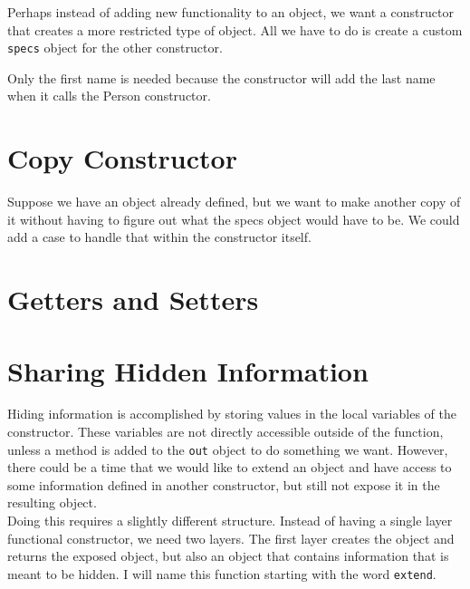 
Perhaps instead of adding new functionality to an object, we want a constructor that creates a more restricted type of object. All we have to do is create a custom \texttt{specs} object for the other constructor.


Only the first name is needed because the constructor will add the last name when it calls the Person constructor.


\section{Copy Constructor}

Suppose we have an object already defined, but we want to make another copy of it without having to figure out what the specs object would have to be. We could add a case to handle that within the constructor itself.

\section{Getters and Setters}

\section{}

\section{Sharing Hidden Information}

Hiding information is accomplished by storing values in the local variables of the constructor. These variables are not directly accessible outside of the function, unless a method is added to the \texttt{out} object to do something we want. However, there could be a time that we would like to extend an object and have access to some information defined in another constructor, but still not expose it in the resulting object.\\

Doing this requires a slightly different structure. Instead of having a single layer functional constructor, we need two layers. The first layer creates the object and returns the exposed object, but also an object that contains information that is meant to be hidden. I will name this function starting with the word \texttt{extend}.\\


